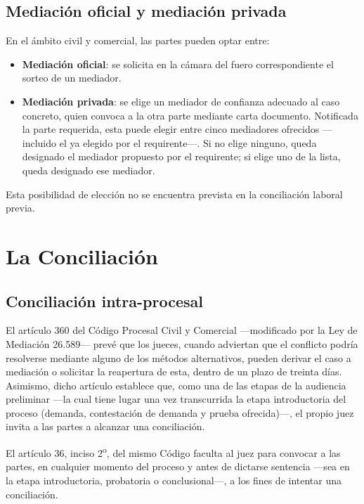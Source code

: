\documentclass[12pt,oneside]{book}
\begin{document}
\section{Mediación oficial y mediación privada}

En el ámbito civil y comercial, las partes pueden optar entre:
\begin{itemize}
    \item \textbf{Mediación oficial}: se solicita en la cámara del fuero correspondiente el sorteo de un mediador.
    \item \textbf{Mediación privada}: se elige un mediador de confianza adecuado al caso concreto, quien convoca a la otra parte mediante carta documento. Notificada la parte requerida, esta puede elegir entre cinco mediadores ofrecidos ---incluido el ya elegido por el requirente---. Si no elige ninguno, queda designado el mediador propuesto por el requirente; si elige uno de la lista, queda designado ese mediador.
\end{itemize}

\begin{note}
Esta posibilidad de elección no se encuentra prevista en la conciliación laboral previa.
\end{note}

\chapter{La Conciliación}

\section{Conciliación intra-procesal}

El artículo 360 del Código Procesal Civil y Comercial ---modificado por la Ley de Mediación 26.589--- prevé que los jueces, cuando adviertan que el conflicto podría resolverse mediante alguno de los métodos alternativos, pueden derivar el caso a mediación o solicitar la reapertura de esta, dentro de un plazo de treinta días. Asimismo, dicho artículo establece que, como una de las etapas de la audiencia preliminar ---la cual tiene lugar una vez transcurrida la etapa introductoria del proceso (demanda, contestación de demanda y prueba ofrecida)---, el propio juez invita a las partes a alcanzar una conciliación.

El artículo 36, inciso 2\textsuperscript{o}, del mismo Código faculta al juez para convocar a las partes, en cualquier momento del proceso y antes de dictarse sentencia ---sea en la etapa introductoria, probatoria o conclusional---, a los fines de intentar una conciliación.
\end{document}
